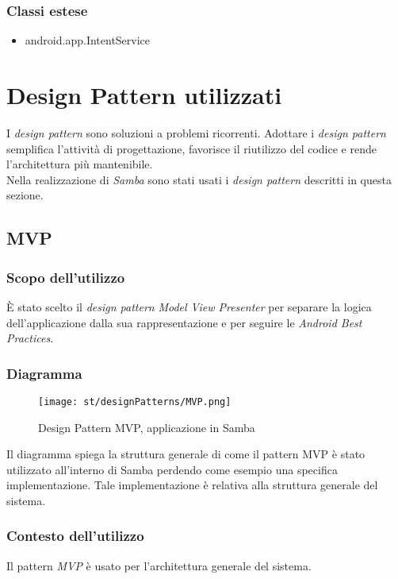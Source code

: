 \subsubsection{Classi estese}
\begin{itemize}
	\item android.app.IntentService
\end{itemize}


\section{Design Pattern utilizzati}
I \emph{design pattern} sono soluzioni a problemi ricorrenti. Adottare i \emph{design pattern} semplifica
l'attività di progettazione, favorisce il riutilizzo del codice e rende l'architettura
più mantenibile.\\
Nella realizzazione di \emph{Samba} sono stati usati i \emph{design pattern} descritti in questa sezione.

\subsection{MVP}
\subsubsection{Scopo dell'utilizzo}
È stato scelto il \emph{design pattern} \emph{Model View Presenter} per separare la logica dell'applicazione dalla sua rappresentazione e per seguire le \emph{Android Best Practices}.
\subsubsection{Diagramma}
\begin{figure}[H] 
    \centering 
    \texttt{[image: st/designPatterns/MVP.png]} 
    \caption{Design Pattern MVP, applicazione in Samba}
\end{figure}
Il diagramma spiega la struttura generale di come il pattern MVP è stato utilizzato all'interno di Samba perdendo come esempio una specifica implementazione. Tale implementazione è relativa alla struttura generale del sistema.
\subsubsection{Contesto dell'utilizzo}
Il pattern \emph{MVP} è usato per l'architettura generale del sistema. 

